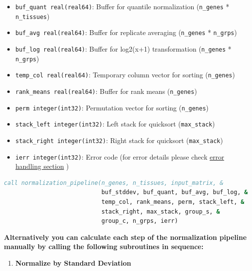 \documentclass[11pt]{article}
\begin{document}
\begin{enumerate}
\begin{itemize}
	      	\item \texttt{buf\_quant real(real64)}: Buffer for quantile normalization
	      	      (\texttt{n\_genes} * \texttt{n\_tissues})
	      	      
	      	\item \texttt{buf\_avg real(real64)}: Buffer for replicate averaging (\texttt{n\_genes}
	      	      * \texttt{n\_grps})
	      	      
	      	\item \texttt{buf\_log real(real64)}: Buffer for log2(x+1)
	      	      transformation (\texttt{n\_genes} * \texttt{n\_grps})
	      	      
	      	\item \texttt{temp\_col real(real64)}: Temporary column vector for sorting
	      	      (\texttt{n\_genes})
	      	      
	      	\item \texttt{rank\_means real(real64)}: Buffer for rank means (\texttt{n\_genes})
	      	      
	      	\item \texttt{perm integer(int32)}: Permutation vector for sorting (\texttt{n\_genes})
	      	      
	      	\item \texttt{stack\_left integer(int32)}: Left stack for quicksort (\texttt{max\_stack})
	      	      
	      	\item \texttt{stack\_right integer(int32)}: Right stack for quicksort (\texttt{max\_stack})
	      	      
	      	\item \texttt{ierr integer(int32)}: Error code (for error details please
	      	      check \hyperref[sec:error-handling]{error handling section} )
	      \end{itemize}
	      
	      \begin{lstlisting}[language=Fortran, caption={Normalization Pipeline}]
call normalization_pipeline(n_genes, n_tissues, input_matrix, &
                            buf_stddev, buf_quant, buf_avg, buf_log, &
                            temp_col, rank_means, perm, stack_left, &
                            stack_right, max_stack, group_s, &
                            group_c, n_grps, ierr)
	      \end{lstlisting}
	      
	      \textbf{Alternatively you can calculate each step of the normalization
	      pipeline manually by calling the following subroutines in sequence:}
	      \begin{enumerate}
	      	\item \textbf{Normalize by Standard Deviation}
	      	      

\end{enumerate}
\end{enumerate}
\end{document}
